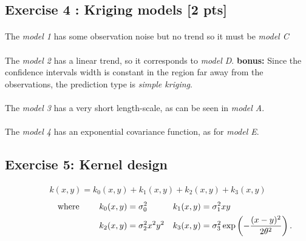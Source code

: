 \documentclass[a4paper,10pt]{article}
\begin{document}
\subsection*{Exercise 4 : Kriging models \hfill [2 pts]}

\paragraph{}
The \emph{model 1} has some observation noise but no trend so it must be \emph{model C}

\paragraph{}
The \emph{model 2} has a linear trend, so it corresponds to \emph{model D}. \textbf{bonus:} Since the confidence intervals width is constant in the region far away from the observations, the prediction type is \emph{simple kriging}.

\paragraph{}
The \emph{model 3} has a very short length-scale, as can be seen in \emph{model A}.

\paragraph{}
The \emph{model 4} has an exponential covariance function, as for \emph{model E}.

\subsection*{Exercise 5: Kernel design}

\begin{align*}
 k(x,y)= k_0(x,y) + k_1(x,y) + k_2(x,y) + k_3(x,y)
\end{align*}
\begin{align*}
 \text{\qquad \qquad where \qquad} k_0(x,y)&=\sigma_0^2   &  k_1(x,y)&=\sigma_1^2 xy \\
 k_2(x,y)&= \sigma_2^2 x^2y^2 & k_3(x,y)&=\sigma_3^2 \exp \left(-\frac{(x-y)^2}{2 \theta^2} \right) .
\end{align*}
\end{document}
